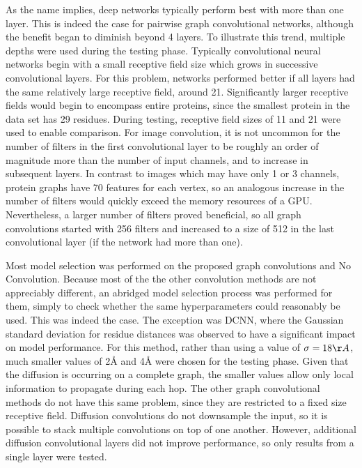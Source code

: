 As the name implies, deep networks typically perform best with more than one layer. 
This is indeed the case for pairwise graph convolutional networks, although the benefit began to diminish beyond 4 layers.
To illustrate this trend, multiple depths were used during the testing phase.
Typically convolutional neural networks begin with a small receptive field size which grows in successive convolutional layers.
For this problem, networks performed better if all layers had the same relatively large receptive field, around 21. 
Significantly larger receptive fields would begin to encompass entire proteins, since the smallest protein in the data set has 29 residues.
During testing, receptive field sizes of 11 and 21 were used to enable comparison.
For image convolution, it is not uncommon for the number of filters in the first convolutional layer to be roughly an order of magnitude more than the number of input channels, and to increase in subsequent layers.
In contrast to images which may have only 1 or 3 channels, protein graphs have 70 features for each vertex, so an analogous increase in the number of filters would quickly exceed the memory resources of a GPU.
Nevertheless, a larger number of filters proved beneficial, so all graph convolutions started with 256 filters and increased to a size of 512 in the last convolutional layer (if the network had more than one).


Most model selection was performed on the proposed graph convolutions and No Convolution.
Because most of the the other convolution methods are not appreciably different, an abridged model selection process was performed for them, simply to check whether the same hyperparameters could reasonably be used.
This was indeed the case.
The exception was DCNN, where the Gaussian standard deviation for residue distances was observed to have a significant impact on model performance. 
For this method, rather than using a value of $\sigma = 18\AA$, much smaller values of 2\AA{} and 4\AA{} were chosen for the testing phase.
Given that the diffusion is occurring on a complete graph, the smaller values allow only local information to propagate during each hop.
The other graph convolutional methods do not have this same problem, since they are restricted to a fixed size receptive field. 
Diffusion convolutions do not downsample the input, so it is possible to stack multiple convolutions on top of one another.
However, additional diffusion convolutional layers did not improve performance, so only results from a single layer were tested.

